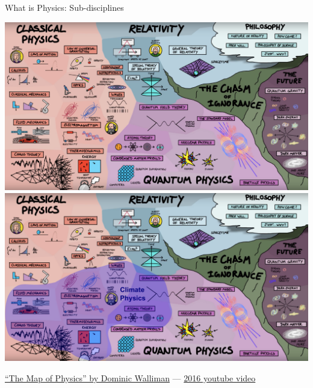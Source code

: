 \documentclass[12pt]{beamer}
\begin{document}
\begin{frame}{What is Physics: Sub-disciplines}

      \begin{overprint}
      \includegraphics[width=\textwidth]{images/map-of-physics-walliman}
      \includegraphics[width=\textwidth]{images/map-of-physics-walliman_w-climate-overlay}
      \end{overprint}
      
{\tiny \href{https://www.informationisbeautifulawards.com/showcase/1793-the-map-of-physics}{``The Map of Physics'' by Dominic Walliman} --- \href{https://www.youtube.com/watch?v=ZihywtixUYo}{2016 youtube video}}

\end{frame}
\end{document}
